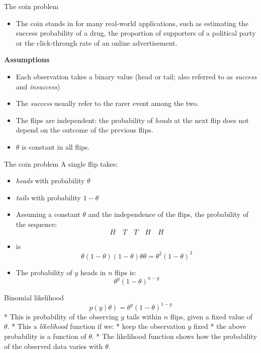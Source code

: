 \documentclass[
  13pt,
  ignorenonframetext,
]{beamer}
\providecommand{\tightlist}{%
  \setlength{\itemsep}{0pt}\setlength{\parskip}{0pt}}
\begin{document}
\begin{frame}{The coin problem}
\protect\hypertarget{the-coin-problem}{}
\begin{itemize}
\tightlist
\item
  The coin stands in for many real-world applications, such as
  estimating the success probability of a drug, the proportion of
  supporters of a political party or the click-through rate of an online
  advertisement.
\end{itemize}

\textbf{Assumptions}

\begin{itemize}
\tightlist
\item
  Each observation takes a binary value (head or tail; also referred to
  as \emph{success} and \emph{insuccess})
\item
  The \emph{success} usually refer to the rarer event among the two.
\item
  The flips are independent: the probability of \emph{heads} at the next
  flip does not depend on the outcome of the previous flips.
\item
  \(\theta\) is constant in all flips.
\end{itemize}
\end{frame}

\begin{frame}{The coin problem}
\protect\hypertarget{the-coin-problem-1}{}
A single flip takes:

\begin{itemize}
\item
  \emph{heads} with probability \(\theta\)
\item
  \emph{tails} with probability \(1-\theta\)
\item
  Assuming a constant \(\theta\) and the independence of the flips, the
  probability of the sequence: \[H \quad T  \quad T \quad H \quad H\]
\item
  is
  \[ \theta (1-\theta) (1-\theta) \theta \theta = \theta^2 (1-\theta)^3\]
\item
  The probability of \(y\) heads in \(n\) flips is:
  \[\theta^y (1-\theta)^{n-y}\]
\end{itemize}
\end{frame}

\begin{frame}{Binomial likelihood}
\protect\hypertarget{binomial-likelihood}{}
\[p(y \mid \theta) = \theta^y (1 − \theta)^{1−y}\] * This is probability
of the observing \(y\) tails within \(n\) flips, given a fixed value of
\(\theta\). * This a \emph{likelihood} function if we: * keep the
observation \(y\) fixed * the above probability is a function of
\(\theta\). * The likelihood function shows how the probability of the
observed data varies with \(\theta\).
\end{frame}
\end{document}
